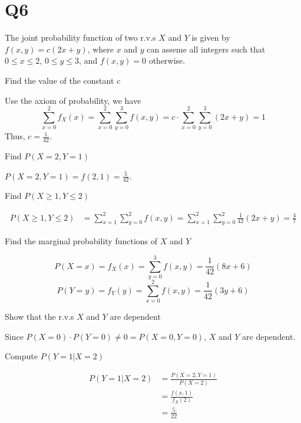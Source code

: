 \documentclass[11pt]{article}
\begin{document}
\section*{Q6}
The joint probability function of two r.v.s $X$ and $Y$ is given by 
$f(x,y)=c(2x+y)$, where $x$ and $y$ can asseme all integers such that 
$0\le x\le 2$, $0\le y\le 3$, and $f(x,y)=0$ otherwise.
\begin{qparts}
    
    \item Find the value of the constant $c$
    \begin{solution}
        Use the axiom of probability, we have $$\sum_{x=0}^{2}f_{X}(x)
        =\sum_{x=0}^{2}\sum_{y=0}^{3}f(x,y)
        =c\cdot \sum_{x=0}^{2}\sum_{y=0}^{3} (2x+y)=1$$
        Thus, $c=\frac{1}{42}$.
    \end{solution}
    
    \item Find $P(X=2,Y=1)$
    \begin{solution}
        $P(X=2,Y=1)=f(2,1)=\frac{5}{42}$.
    \end{solution}
    
    \item Find $P(X\ge 1,Y\le 2)$
    \begin{solution}
        \begin{align*}
          P(X\ge 1,Y\le 2)&=\sum_{x=1}^{2}\sum_{y=0}^{2}f(x,y)=\sum_{x=1}^{2}\sum_{y=0}^{2}\frac{1}{42}(2x+y)=\frac{4}{7}
        \end{align*}
    \end{solution}

    
    \item Find the marginal probability functions of $X$ and $Y$
    \begin{solution}
        \begin{equation*}
          P(X=x)=f_{X}(x)=\sum_{y=0}^{3}f(x,y)=\frac{1}{42}(8x+6)
        \end{equation*}
        \begin{equation*}
          P(Y=y)=f_{Y}(y)=\sum_{x=0}^{2}f(x,y)=\frac{1}{42}(3y+6)
        \end{equation*}
    \end{solution}
    
    \item Show that the r.v.s $X$ and $Y$ are dependent
    \begin{solution}
        Since $P(X=0)\cdot P(Y=0)\neq 0=P(X=0,Y=0)$, $X$ and $Y$ are 
        dependent.
    \end{solution}
    
    \item Compute $P(Y=1\vert X=2)$
    \begin{solution}
        \begin{align*}
            P(Y=1\vert X=2)&=\frac{P(X=2,Y=1)}{P(X=2)}\\
            &=\frac{f(x,1)}{f_{X}(2)}\\
            &=\frac{5}{22}
        \end{align*}
    \end{solution}
\end{qparts}
\end{document}
